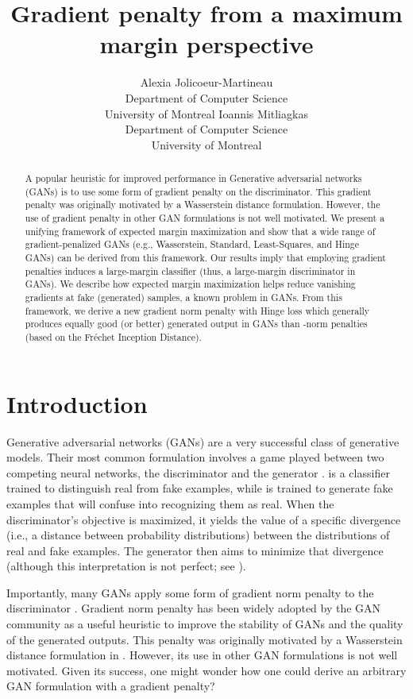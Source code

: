 \documentclass{article}
\title{Gradient penalty from a maximum margin perspective}
\author{Alexia Jolicoeur-Martineau \\
  Department of Computer Science\\
  University of Montreal
  \And
  Ioannis Mitliagkas \\
  Department of Computer Science\\
  University of Montreal
}
\begin{document}
\maketitle

\begin{abstract}
A popular heuristic for improved performance in Generative adversarial networks (GANs) is to use some form of gradient penalty on the discriminator. This gradient penalty was originally motivated by a Wasserstein distance formulation. However, the use of gradient penalty in other GAN formulations is not well motivated. We present a unifying framework of expected margin maximization and show that a wide range of gradient-penalized GANs (e.g., Wasserstein, Standard, Least-Squares, and Hinge GANs) can be derived from this framework. Our results imply that employing gradient penalties induces a large-margin classifier (thus, a large-margin discriminator in GANs). We describe how expected margin maximization helps reduce vanishing gradients at fake (generated) samples, a known problem in GANs. From this framework, we derive a new  gradient norm penalty with Hinge loss which generally produces equally good (or better) generated output in GANs than -norm penalties (based on the Fréchet Inception Distance).
\end{abstract}

\section{Introduction}



    Generative adversarial networks (GANs) \citep{GAN} are a very successful class of generative models.
    Their most common formulation involves a game played between two competing neural networks, the discriminator  and the generator .
     is a classifier trained to distinguish real from fake examples, while  is trained to generate fake examples that will confuse  into recognizing them as real.
    When the discriminator's objective is maximized, it yields the value of a specific divergence (i.e., a distance between probability distributions) between the distributions of real and fake examples. The generator then aims to minimize that divergence (although this interpretation is not perfect; see \citet{jolicoeur2018beyonddivergence}).
    
    Importantly, many GANs apply some form of gradient norm penalty to the discriminator \citep{WGAN-GP,fedus2017many,mescheder2018training,karras2019style}. Gradient norm penalty has been widely adopted by the GAN community as a useful heuristic to improve the stability of GANs and the quality of the generated outputs. This penalty was originally motivated by a Wasserstein distance formulation in \citet{WGAN-GP}. However, its use in other GAN formulations is not well motivated. Given its success, one might wonder how one could derive an arbitrary GAN formulation with a gradient penalty?
    
\end{document}
